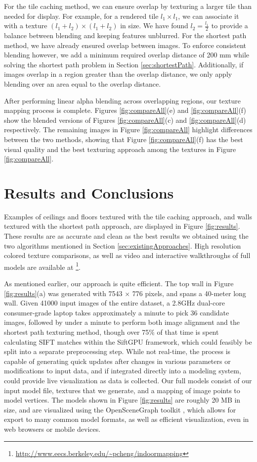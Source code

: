 \documentclass[]{spie}  %
\begin{document}
For the tile caching method, we can ensure overlap by texturing a
larger tile than needed for display. For example, for a rendered tile
$l_1 \times l_1$, we can associate it with a texture $(l_1 + l_2)
\times (l_1 + l_2)$ in size.  We have found $l_2 = \frac{l_1}{2}$ to
provide a balance between blending and keeping features unblurred. For
the shortest path method, we have already ensured overlap between
images. To enforce consistent blending however, we add a minimum
required overlap distance of 200 mm while solving the shortest path
problem in Section \ref{sec:shortestPath}. Additionally, if images
overlap in a region greater than the overlap distance, we only apply
blending over an area equal to the overlap distance.

After performing linear alpha blending across overlapping regions, our
texture mapping process is complete. Figures \ref{fig:compareAll}(e)
and \ref{fig:compareAll}(f) show the blended versions of Figures
\ref{fig:compareAll}(c) and \ref{fig:compareAll}(d) respectively. The
remaining images in Figure \ref{fig:compareAll} highlight differences
between the two methods, showing that Figure \ref{fig:compareAll}(f)
has the best visual quality and the best texturing approach among the
textures in Figure \ref{fig:compareAll}.

\section{Results and Conclusions}
\label{sec:resultsAndConclusions}
Examples of ceilings and floors textured with the tile caching
approach, and walls textured with the shortest path approach, are
displayed in Figure \ref{fig:results}. These results are as accurate
and clean as the best results we obtained using the two algorithms
mentioned in Section \ref{sec:existingApproaches}. High resolution
colored texture comparisons, as well as video and interactive
walkthroughs of full models are available at
\footnote{\url{http://www.eecs.berkeley.edu/~pcheng/indoormapping}}.

As mentioned earlier, our approach is quite efficient. The top wall in
Figure \ref{fig:results}(a) was generated with 7543 $\times$ 776
pixels, and spans a 40-meter long wall. Given 41000 input images of
the entire dataset, a 2.8GHz dual-core consumer-grade laptop takes
approximately a minute to pick 36 candidate images, followed by under
a minute to perform both image alignment and the shortest path
texturing method, though over 75\% of that time is spent calculating
SIFT matches within the SiftGPU framework, which could feasibly be
split into a separate preprocessing step. While not real-time, the
process is capable of generating quick updates after changes in
various parameters or modifications to input data, and if integrated
directly into a modeling system, could provide live visualization as
data is collected. Our full models consist of our input model file,
textures that we generate, and a mapping of image points to model
vertices. The models shown in Figure \ref{fig:results} are roughly 20
MB in size, and are visualized using the OpenSceneGraph toolkit
\cite{openscenegraph}, which allows for export to many common model
formats, as well as efficient visualization, even in web browsers or
mobile devices.
\end{document}
